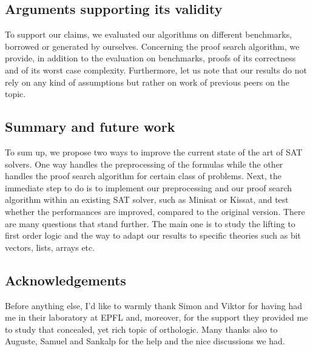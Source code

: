 \documentclass[a4paper, 11pt]{article}
\begin{document}


	\subsection*{Arguments supporting its validity}
	To support our claims, we evaluated our algorithms on different benchmarks, borrowed or generated
	by ourselves.
	Concerning the proof search algorithm, we provide, in addition to the evaluation on benchmarks, 
	proofs of its correctness and of its worst case complexity. Furthermore, let us note that our
	results do not rely on any kind of assumptions but rather on work of previous peers on the topic.



	\subsection*{Summary and future work}
	To sum up, we propose two ways to improve the current state of the art of SAT solvers. 
	One way handles the preprocessing of the formulas while the other handles the proof search
	algorithm for certain class of problems. Next, the immediate step to do is
	to implement our preprocessing and our proof search algorithm within an existing SAT solver, 
	such as Minisat or Kissat, and test
	whether the performances are improved, compared to the original version. There are many questions
	that stand further. The main one is to study the lifting to first order logic and the way to 
	adapt our results to specific theories such as bit vectors, lists, arrays etc.


	\subsection*{Acknowledgements}
	Before anything else, I'd like to warmly thank Simon and Viktor for having had me in their 
	laboratory at EPFL and, moreover, for the support they provided me to study that concealed, yet
	rich topic of orthologic. Many thanks also to Auguste, Samuel and Sankalp for the help and 
	the nice discussions we had.
\end{document}
